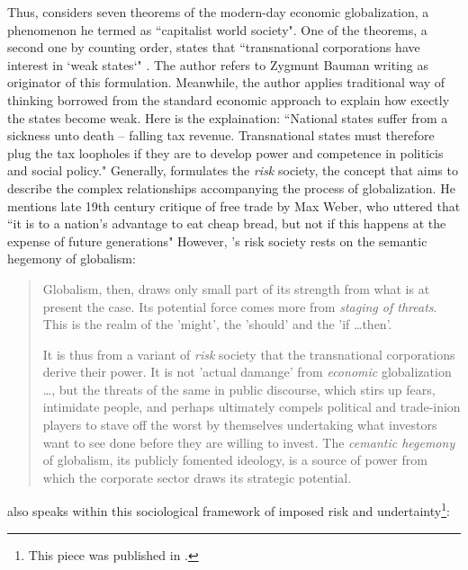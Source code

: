 Thus, \citeauthor{beck2000} considers seven theorems of the modern-day economic globalization, a phenomenon he termed as ``capitalist world society". One of the theorems, a second one by counting order, states that ``transnational corporations have interest in `weak states`" \citep[p.~96]{beck2000}. The author refers to Zygmunt Bauman writing as originator of this formulation. Meanwhile, the author applies traditional way of thinking borrowed from the standard economic approach to explain how exectly the states become weak. Here is the explaination: ``National states suffer from a sickness unto death -- falling tax revenue. Transnational states must therefore plug the tax loopholes if they are to develop power and competence in politicis and social policy." \citep[p.~112]{beck2000} Generally, \citeauthor{beck2000} formulates the \textit{risk} society, the concept that aims to describe the complex relationships accompanying the process of globalization. He mentions late 19th century critique of free trade by Max Weber, who uttered that ``it is to a nation's advantage to eat cheap bread, but not if this happens at the expense of future generations" However, \citeauthor{beck2000}'s risk society rests on the semantic hegemony of globalism:

\begin{quote}
Globalism, then, draws only small part of its strength from what is at present the case. Its potential force comes more from \textit{staging of threats}. This is the realm of the 'might', the 'should' and the 'if \dots then'.\par It is thus from a variant of \textit{risk} society that the transnational corporations derive their power. It is not 'actual damange' from \textit{economic} globalization \dots, but the threats of the same in public discourse, which stirs up fears, intimidate people, and perhaps ultimately compels political and trade-inion players to stave off the worst by themselves undertaking what investors want to see done before they are willing to invest. The \textit{cemantic hegemony} of globalism, its publicly fomented ideology, is a source of power from which the corporate sector draws its strategic potential.
\citep[p.~122, emphasis original]{beck2000}
\end{quote}

\citeauthor{bauman1998} also speaks within this sociological framework of imposed risk and undertainty\footnote{This piece was published in \citep{beilharz2001}.}: 

